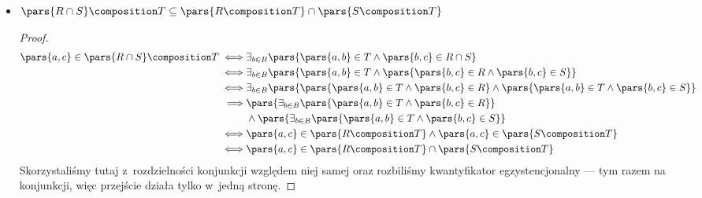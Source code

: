 \begin{description}
\begin{itemize}
\begin{proof}
\begin{equation*}
			            \end{equation*}
			            Skorzystaliśmy tutaj z~rozdzielności konjunkcji względem alternatywy oraz rozbiliśmy kwantyfikator egzystencjonalny na alternatywie.
		            \end{proof}
		      \item \(\pars{R \cap S} \composition T \subseteq \pars{R \composition T} \cap \pars{S \composition T}\)
		            \begin{proof}
			            \begin{equation*}
				            \begin{split}
					            \pars{a, c} \in \pars{R \cap S} \composition T
					            \iff     & \exists_{b \in B} \pars{\pars{a, b} \in T \land \pars{b, c} \in R \cap S}                                                        \\
					            \iff     & \exists_{b \in B} \pars{\pars{a, b} \in T \land \pars{\pars{b, c} \in R \land \pars{b, c} \in S}}                                \\
					            \iff     & \exists_{b \in B} \pars{\pars{\pars{a, b} \in T \land \pars{b, c} \in R} \land \pars{\pars{a, b} \in T \land \pars{b, c} \in S}} \\
					            \implies & \pars{\exists_{b \in B} \pars{\pars{a, b} \in T \land \pars{b, c} \in R}}                                                        \\
					                     & \land \pars{\exists_{b \in B}\pars{\pars{a, b} \in T \land \pars{b, c} \in S}}                                                   \\
					            \iff     & \pars{a, c} \in \pars{R \composition T} \land \pars{a, c} \in \pars{S \composition T}                                            \\
					            \iff     & \pars{a, c} \in \pars{R \composition T} \cap \pars{S \composition T}
				            \end{split}
			            \end{equation*}
			            Skorzystaliśmy tutaj z~rozdzielności konjunkcji względem niej samej oraz rozbiliśmy kwantyfikator egzystencjonalny --- tym razem na konjunkcji, więc przejście działa tylko w~jedną stronę.
		            \end{proof}
	      \end{itemize}
\end{description}
